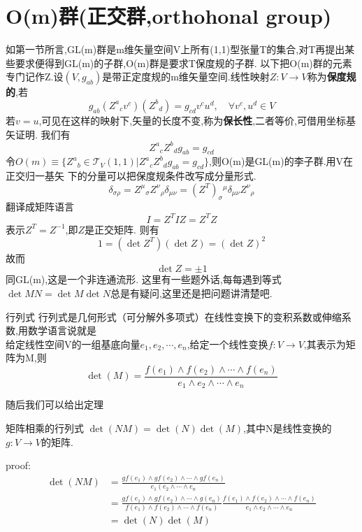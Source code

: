 \documentclass[../main.tex]{subfiles}
\begin{document}
\section{O(m)群(正交群,orthohonal group)}
如第一节所言,GL(m)群是m维矢量空间V上所有(1,1)型张量T的集合,对T再提出某些要求便得到GL(m)的子群,O(m)群是要求T保度规的子群.
以下把O(m)群的元素专门记作Z.设$(V,g_{ab})$是带正定度规的m维矢量空间.线性映射$Z:V \rightarrow V$称为\textbf{保度规的},若
$$g_{ab}(Z^a{}_cv^c)(Z^b{}_d) = g_{cd}v^cu^d,\quad \forall v^c,u^d \in V$$
若$v=u$,可见在这样的映射下,矢量的长度不变,称为\textbf{保长性},二者等价,可借用坐标基矢证明.
我们有\begin{equation*}
    Z^a{}_cZ^b{}_d g_{ab}=g_{cd}
\end{equation*}
令$O(m)\equiv \{Z^a{}_b\in\mathscr{T}_V(1,1)|Z^a{}_cZ^b{}_d g_{ab}=g_{cd}\}$,则O(m)是GL(m)的李子群.用V在正交归一基矢
下的分量可以把保度规条件改写成分量形式.
$$\delta_{\sigma \rho} = Z^{\mu}{}_{\sigma}Z^{\nu}{}_{\rho}\delta_{\mu \nu} = (Z^T)_{\sigma}{}^{\mu}\delta_{\mu\nu}Z^{\nu}{}_{\rho}$$
翻译成矩阵语言 $$ I = Z^{T}IZ = Z^TZ$$
表示$Z^T= Z^{-1}$,即$Z$是正交矩阵.
则有$$1=(\det Z^T)(\det Z) = (\det Z)^2$$
故而$$\det Z = \pm 1$$同GL(m),这是一个非连通流形.
这里有一些题外话,每每遇到等式$\det{MN} = \det{M}\det{N}$总是有疑问,这里还是把问题讲清楚吧.
\begin{definition}{}{行列式}
    行列式是几何形式（可分解外多项式）在线性变换下的变积系数或伸缩系数,用数学语言说就是\\
    给定线性空间V的一组基底向量$e_1,e_2,\cdots,e_n$,给定一个线性变换$f:V\rightarrow V$,其表示为矩阵为M,则
    $$\det(M) = \frac{f(e_1)\wedge f(e_2) \wedge \cdots \wedge f(e_n)}{e_1 \wedge e_2\wedge \cdots \wedge e_n}$$
\end{definition}
随后我们可以给出定理
\begin{theorem}{}{矩阵相乘的行列式}
    $\det(NM) = \det(N)\det(M)$,其中N是线性变换的$g:V\rightarrow V$的矩阵.
\end{theorem}
proof:\begin{align*}
\det(N M)&=\frac{g f\left(e_{1}\right) \wedge g f\left(e_{2}\right) \wedge \cdots \wedge g f\left(e_{n}\right)}{e_{1}\left(e_{2} \wedge \cdots \wedge e_{n}\right.} \\
&=\frac{g f\left(e_{1}\right) \wedge g f\left(e_{2}\right) \wedge \cdots  \wedge g\left(e_{n}\right)}{f\left(e_{1}\right) \wedge f\left(e_{2}\right) \wedge \cdots \wedge f\left(e_{n}\right)} \frac{f\left(e_{1}\right) \wedge f\left(e_{2}\right) \wedge \cdots \wedge f\left(e_{n}\right)}{e_{1} \wedge e_{2} \wedge \cdots \wedge e_{n}} \\
&=\det(N) \det(M)
\end{align*}
\end{document}
